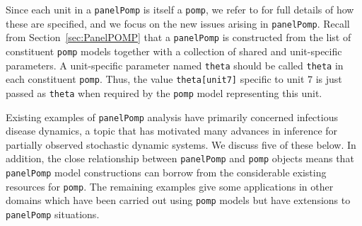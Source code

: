 \documentclass[12pt]{article}\usepackage[]{graphicx}\usepackage[table]{xcolor}
\newcommand\code{\texttt}
\newcommand\pomp{\texttt{pomp}\xspace}
\begin{document}
Since each unit in a  \code{panelPomp} is itself a \code{pomp}, we refer to \citet{king16} for full details of how these are specified, and we focus on the new issues arising in \code{panelPomp}.
Recall from Section~\ref{sec:PanelPOMP} that a \code{panelPomp} is constructed from the list of constituent \code{pomp} models together with a collection of shared and unit-specific parameters.
A unit-specific parameter named \code{theta} should be called \code{theta} in each constituent \code{pomp}.
Thus, the value \code{theta[unit7]} specific to unit 7 is just passed as \code{theta} when required by the \code{pomp} model representing this unit.

Existing examples of \code{panelPomp} analysis have primarily concerned infectious disease dynamics, a topic that has motivated many advances in inference for partially observed stochastic dynamic systems.
We discuss five of these below.
In addition, the close relationship between \code{panelPomp} and \code{pomp} objects means that \code{panelPomp} model constructions can borrow from the considerable existing resources for \pomp.
The remaining examples give some applications in other domains which have been carried out using \code{pomp} models but have extensions to \code{panelPomp} situations.
\end{document}
